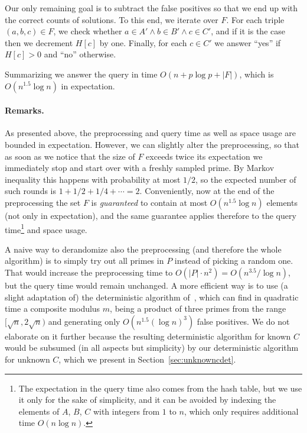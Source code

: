 \documentclass[10pt,a4paper]{article}
\begin{document}
Our only remaining goal is to subtract the false positives so that we end up with the correct counts of solutions. To this end, we iterate over $F$. For each triple $(a,b,c) \in F$, we check whether $a \in A' \land b \in B' \land c \in C'$, and if it is the case then we decrement $H[c]$ by one.
Finally, for each $c \in C'$ we answer ``yes'' if $H[c] > 0$ and ``no'' otherwise.

Summarizing we answer the query in time $O(n + p \log p + |F|)$, which is $O(n^{1.5} \log n)$ in expectation.

\paragraph{Remarks.}
As presented above, the preprocessing and query time as well as space usage are bounded in expectation. However, we can slightly alter the preprocessing, so that as soon as we notice that the size of $F$ exceeds twice its expectation we immediately stop and start over with a freshly sampled prime. By Markov inequality this happens with probability at most $1/2$, so the expected number of such rounds is $1+1/2+1/4+\cdots=2$. Conveniently, now at the end of the preprocessing the set $F$ is \emph{guaranteed} to contain at most $O(n^{1.5} \log n)$ elements (not only in expectation), and the same guarantee applies therefore to the query time\footnote{The expectation in the query time also comes from the hash table, but we use it only for the sake of simplicity, and it can be avoided by indexing the elements of $A$, $B$, $C$ with integers from $1$ to $n$, which only requires additional time $O(n \log n)$.} and space usage.

A naive way to derandomize also the preprocessing (and therefore the whole algorithm) is to simply try out all primes in $P$ instead of picking a random one. That would increase the preprocessing time to $O(|P| \cdot n^2) = O(n^{3.5}/\log n)$, but the query time would remain unchanged.
A more efficient way is to use (a slight adaptation of) the deterministic algorithm of~\cite[Lemma~11]{FischerK024}, which can find in quadratic time a composite modulus $m$, being a product of three primes from the range $[\sqrt{n}, 2\sqrt{n})$ and generating only $O(n^{1.5} (\log n)^3)$ false positives. We do not elaborate on it further because the resulting deterministic algorithm for known $C$ would be subsumed (in all aspects but simplicity) by our deterministic algorithm for unknown $C$, which we present in Section~\ref{sec:unknowncdet}.    
    
\end{document}
